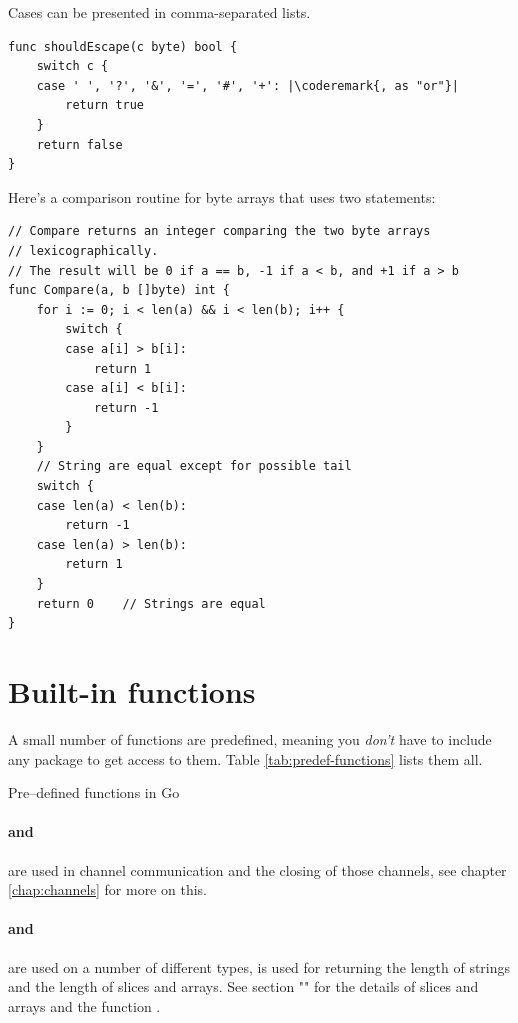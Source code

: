Cases can be presented in comma-separated lists.
\begin{lstlisting}
func shouldEscape(c byte) bool {
    switch c {
    case ' ', '?', '&', '=', '#', '+': |\coderemark{, as "or"}|
        return true
    }
    return false
}
\end{lstlisting}

Here's a comparison routine for byte arrays that uses two  statements:
\begin{lstlisting}
// Compare returns an integer comparing the two byte arrays
// lexicographically.
// The result will be 0 if a == b, -1 if a < b, and +1 if a > b
func Compare(a, b []byte) int {
    for i := 0; i < len(a) && i < len(b); i++ {
        switch {
        case a[i] > b[i]:
            return 1
        case a[i] < b[i]:
            return -1
        }
    }
    // String are equal except for possible tail
    switch {
    case len(a) < len(b):
        return -1
    case len(a) > len(b):
        return 1
    }
    return 0	// Strings are equal
}
\end{lstlisting}

\section{Built-in functions}
A small number of functions are predefined, meaning 
you \emph{don't} have to include any package to get
access to them. Table \ref{tab:predef-functions} lists them all.

\begin{table}[H]
\begin{center}
\caption{Pre--defined functions in Go}
\label{tab:predef-functions}

\end{center}
\end{table}

\paragraph{ and } are used in
channel communication and the closing of those channels, see chapter \ref{chap:channels}
for more on this.

\paragraph{ and } are used on a number of different
types,  is
used for returning the length of strings and the length of slices and
arrays. See section "" for the details of slices and
arrays and the function
.

